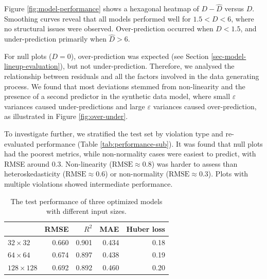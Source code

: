 \documentclass[]{interact}
\theoremstyle{plain}%
\theoremstyle{definition}
\theoremstyle{remark}
\begin{document}
Figure \ref{fig:model-performance} shows a hexagonal heatmap of
\(D - \hat{D}\) versus \(D\). Smoothing curves \citep[fitted by
generalized additive models,][]{hastie2017generalized} reveal that all
models performed well for \(1.5 < D < 6\), where no structural issues
were observed. Over-prediction occurred when \(D < 1.5\), and
under-prediction primarily when \(\hat{D} > 6\).

For null plots (\(D = 0\)), over-prediction was expected (see Section
\ref{sec-model-lineup-evaluation}), but not under-prediction. Therefore,
we analysed the relationship between residuals and all the factors
involved in the data generating process. We found that most deviations
stemmed from non-linearity and the presence of a second predictor in the
synthetic data model, where small \(\varepsilon\) variances caused
under-predictions and large \(\varepsilon\) variances caused
over-prediction, as illustrated in Figure \ref{fig:over-under}.

To investigate further, we stratified the test set by violation type and
re-evaluated performance (Table \ref{tab:performance-sub}). It was found
that null plots had the poorest metrics, while non-normality cases were
easiest to predict, with RMSE around \(0.3\). Non-linearity
(\(\text{RMSE} \approx  0.8\)) was harder to assess than
heteroskedasticity (\(\text{RMSE} \approx  0.6\)) or non-normality
(\(\text{RMSE} \approx  0.3\)). Plots with multiple violations showed
intermediate performance.

\begin{table}

\caption{\label{tab:performance}The test performance of three optimized models with different input sizes.}
\centering
\begin{tabular}[t]{lrrrr}
\toprule
 & RMSE & $R^2$ & MAE & Huber loss\\
\midrule
$32 \times 32$ & 0.660 & 0.901 & 0.434 & 0.18\\
$64 \times 64$ & 0.674 & 0.897 & 0.438 & 0.19\\
$128 \times 128$ & 0.692 & 0.892 & 0.460 & 0.20\\
\bottomrule
\end{tabular}
\end{table}
\end{document}
